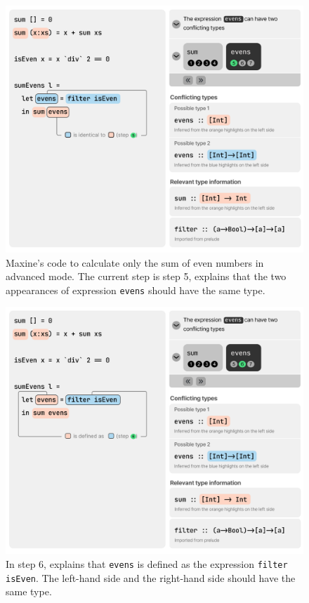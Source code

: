 \begin{figure}
        \centering
        \includegraphics[width=\linewidth,trim=0mm 8mm 0mm 0mm]{images/advanced-mode-1.pdf}
        \caption{
            Maxine's code to calculate only the sum 
            of even numbers in advanced mode. 
            The current step is step 5, \chameleon{} 
            explains that the two appearances of expression 
            \texttt{evens} should have the same type.
        }
        \label{fig:advanced-mode-step5}
\end{figure}

\begin{figure}
        \centering
        \includegraphics[width=\linewidth,trim=0mm 8mm 0mm 0mm]{images/advanced-mode-2.pdf}
        \caption{
            In step 6, \chameleon{} 
            explains that \texttt{evens} is defined as
            the expression \texttt{filter isEven}. The left-hand side
            and the right-hand side should have the same type.
        }
        \label{fig:advanced-mode-step6}
\end{figure}

